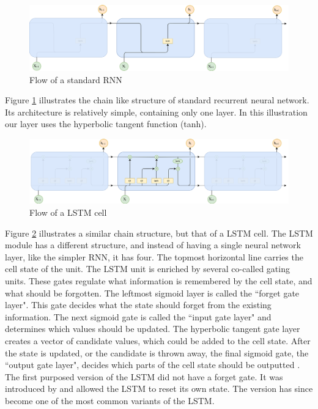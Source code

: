 \begin{figure}[ht]
    \centering
    \includegraphics[width=1\textwidth]{fig/related_work/rnn_flow.png}
    \caption{Flow of a standard RNN}
    \label{fig:nn-rnn-flow}
\end{figure}

Figure \ref{fig:nn-rnn-flow} illustrates the chain like structure of standard recurrent neural network. Its architecture is relatively simple, containing only one layer. In this illustration our layer uses the hyperbolic tangent function (tanh).

\begin{figure}[ht]
    \centering
    \includegraphics[width=1\textwidth]{fig/related_work/lstm_flow.png}
    \caption{Flow of a LSTM cell}
    \label{fig:nn-lstm-flow}
\end{figure}

Figure \ref{fig:nn-lstm-flow} illustrates a similar chain structure, but that of a LSTM cell. The LSTM module has a different structure, and instead of having a single neural network layer, like the simpler RNN, it has four. The topmost horizontal line carries the cell state of the unit. The LSTM unit is enriched by several co-called gating units. These gates regulate what information is remembered by the cell state, and what should be forgotten. The leftmost sigmoid layer is called the ``forget gate layer". This gate decides what the state should forget from the existing information. The next sigmoid gate is called the ``input gate layer" and determines which values should be updated. The hyperbolic tangent gate layer creates a vector of candidate values, which could be added to the cell state. After the state is updated, or the candidate is thrown away, the final sigmoid gate, the ``output gate layer", decides which parts of the cell state should be outputted \citep{hochreiter1997long, goodfellow2016deeplearning, olah2015lstm, gers2002learning}. The first purposed version of the LSTM did not have a forget gate. It was introduced by \citep{gers2000learning} and allowed the LSTM to reset its own state. The version has since become one of the most common variants of the LSTM.

